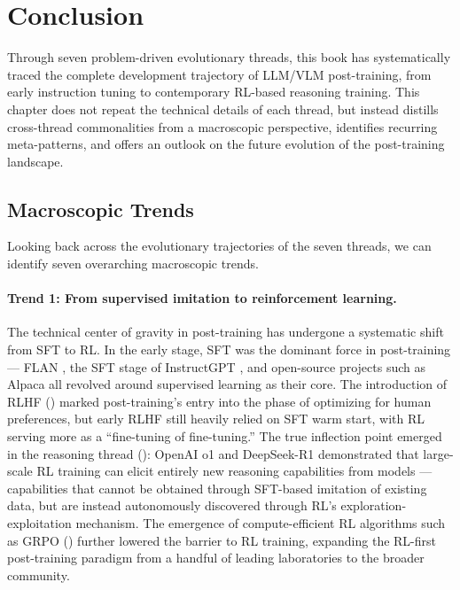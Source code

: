 \section{Conclusion}
\label{sec:t8}

Through seven problem-driven evolutionary threads,
this book has systematically traced the complete development trajectory of LLM/VLM post-training,
from early instruction tuning to contemporary RL-based reasoning training.
This chapter does not repeat the technical details of each thread,
but instead distills cross-thread commonalities from a macroscopic perspective,
identifies recurring meta-patterns,
and offers an outlook on the future evolution of the post-training landscape.

\subsection{Macroscopic Trends}
\label{sec:t8-trends}

Looking back across the evolutionary trajectories of the seven threads, we can identify seven overarching macroscopic trends.

\paragraph{Trend 1: From supervised imitation to reinforcement learning.}
The technical center of gravity in post-training has undergone a systematic shift from SFT to RL.
In the early stage, SFT was the dominant force in post-training ---
FLAN \cite{wei2022flan}, the SFT stage of InstructGPT \cite{ouyang2022instructgpt},
and open-source projects such as Alpaca \cite{taori2023alpaca} all revolved around supervised learning as their core.
The introduction of RLHF () marked post-training's entry into the phase of optimizing for human preferences,
but early RLHF still heavily relied on SFT warm start, with RL serving more as a ``fine-tuning of fine-tuning.''
The true inflection point emerged in the reasoning thread ():
OpenAI o1 \cite{openai2024o1} and DeepSeek-R1 \cite{deepseek2025r1}
demonstrated that large-scale RL training can elicit entirely new reasoning capabilities from models ---
capabilities that cannot be obtained through SFT-based imitation of existing data,
but are instead autonomously discovered through RL's exploration-exploitation mechanism.
The emergence of compute-efficient RL algorithms such as GRPO \cite{shao2024grpo}
() further lowered the barrier to RL training,
expanding the RL-first post-training paradigm from a handful of leading laboratories to the broader community.

